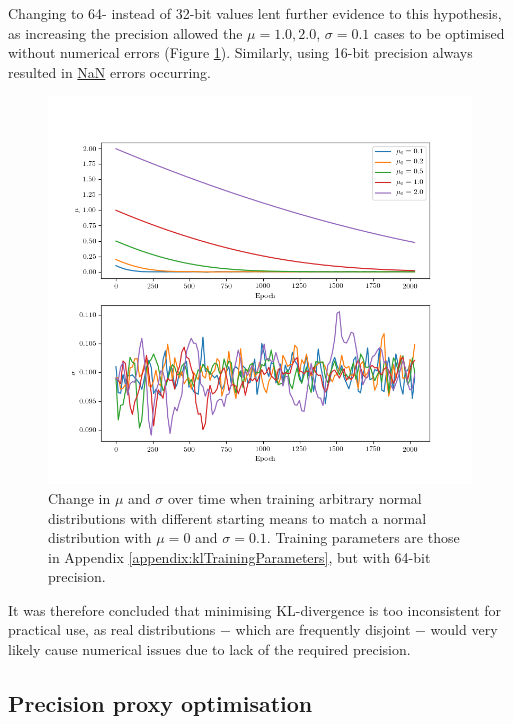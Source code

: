 \documentclass[../../main.tex]{subfiles}
\begin{document}
Changing to 64- instead of 32-bit values lent further evidence to this hypothesis, as increasing the precision allowed the $\mu=1.0,2.0$, $\sigma=0.1$ cases to be optimised without numerical errors (Figure \ref{fig:narrowKLDivergenceFloat64}).
Similarly, using 16-bit precision always resulted in \url{NaN} errors occurring.
\begin{figure}[H]
    \begin{center}
    \includegraphics[width=\textwidth]{narrowKLDivergenceFloat64}
    \caption{
        Change in $\mu$ and $\sigma$ over time when training arbitrary normal distributions with different starting means to match a normal distribution with $\mu=0$ and $\sigma=0.1$. 
        Training parameters are those in Appendix \ref{appendix:klTrainingParameters}, but with 64-bit precision.
    }
    \label{fig:narrowKLDivergenceFloat64}
    \end{center}
\end{figure}
It was therefore concluded that minimising KL-divergence is too inconsistent for practical use, as real distributions $-$ which are frequently disjoint $-$ would very likely cause numerical issues due to lack of the required precision.

\subsection{Precision proxy optimisation} \label{subsection:precisionProxyOptimisation}
\end{document}

